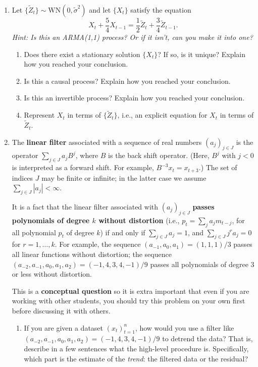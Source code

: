 \documentclass[10pt, letterpaper]{scrartcl}
\newcommand{\<}{\langle}  %
\renewcommand{\>}{\rangle}%
\newcommand{\WN}{\text{WN}}
\begin{document}
\begin{enumerate}[align=left, leftmargin=*, label=\sffamily\bfseries Problem \arabic*:]    

\item Let $\{ \widetilde Z_t \} \sim \WN(0,\widetilde \sigma^2)$ and let $\{X_t\}$ satisfy the equation
\[
X_t + \frac54 X_{t-1} = \frac12 \tilde Z_t + \frac34 \widetilde Z_{t-1}.
\]
{\em Hint: Is this an ARMA(1,1) process? Or if it isn't, can you make it into one?}
\begin{enumerate}
\item Does there exist a stationary solution $\{X_t\}$?  If so, is it unique? Explain how you reached your conclusion.
\item Is this a causal process? Explain how you reached your conclusion.
\item Is this an invertible process? Explain how you reached your conclusion.
\item Represent $X_t$ in terms of $\{\widetilde Z_t\}$, i.e., an explicit equation for $X_t$ in terms of $\widetilde Z_t$.
\end{enumerate}


\item The \textbf{linear filter} associated with a sequence of real numbers $(a_j)_{j\in J}$ is the operator $\sum_{j\in J} a_jB^j$, where $B$ is the back shift operator. (Here, $B^j$ with $j<0$ is interpreted as a forward shift. For example, $B^{-3}x_t=x_{t+3}$.) The set of indices $J$ may be finite or infinite; in the latter case we assume $\sum_{j\in J} |a_j| < \infty$.

It is a fact that the linear filter associated with $(a_j)_{j\in J}$ \textbf{passes polynomials of degree $k$ without distortion} (i.e., $p_t=\sum_ja_jm_{t-j}$, for all polynomial $p_t$ of degree $k$) if and only if $\sum_{j\in J} a_j=1$, and $\sum_{j\in J} j^ra_j=0$ for $r=1,\ldots,k$.  For example, the sequence $(a_{-1},a_0,a_1) = (1,1,1)/3$ passes all linear functions without distortion; the sequence $(a_{-2},a_{-1},a_0,a_1,a_2)=(-1,4,3,4,-1)/9$ passes all polynomials of degree $3$ or less without distortion.

This is a \textbf{conceptual question} so it is extra important that even if you are working with other students, you should try this problem on your own first before discussing it with others.

\begin{enumerate}
\item If you are given a dataset $(x_t)_{t=1}^n$, how would you use a filter like $(a_{-2},a_{-1},a_0,a_1,a_2)=(-1,4,3,4,-1)/9$ to detrend the data?  That is, describe in a few sentences what the high-level procedure is. Specifically, which part is the estimate of the \emph{trend}: the  filtered data or the residual?


\end{enumerate}
\end{enumerate}
\end{document}

